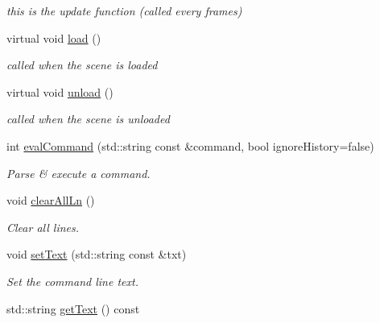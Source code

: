 \begin{DoxyCompactItemize}
\begin{DoxyCompactList}\small\item\em this is the update function (called every frames) \end{DoxyCompactList}\item 
\mbox{\label{class_scene_cheat_code_acbde1c4ec7592376b7a46cdbfdf98d4b}} 
virtual void \hyperlink{class_scene_cheat_code_acbde1c4ec7592376b7a46cdbfdf98d4b}{load} ()
\begin{DoxyCompactList}\small\item\em called when the scene is loaded \end{DoxyCompactList}\item 
\mbox{\label{class_scene_cheat_code_acb2e2c27b2cfb999815caebb65ab3231}} 
virtual void \hyperlink{class_scene_cheat_code_acb2e2c27b2cfb999815caebb65ab3231}{unload} ()
\begin{DoxyCompactList}\small\item\em called when the scene is unloaded \end{DoxyCompactList}\item 
int \hyperlink{class_scene_cheat_code_a8195fdcac7fa062e3c078e502edccddf}{eval\+Command} (std\+::string const \&command, bool ignore\+History=false)
\begin{DoxyCompactList}\small\item\em Parse \& execute a command. \end{DoxyCompactList}\item 
\mbox{\label{class_scene_cheat_code_a3a53c0bb0a52abad44966308a09aa48d}} 
void \hyperlink{class_scene_cheat_code_a3a53c0bb0a52abad44966308a09aa48d}{clear\+All\+Ln} ()
\begin{DoxyCompactList}\small\item\em Clear all lines. \end{DoxyCompactList}\item 
void \hyperlink{class_scene_cheat_code_a1b35f3a6cce3767aa22a4694e3271532}{set\+Text} (std\+::string const \&txt)
\begin{DoxyCompactList}\small\item\em Set the command line text. \end{DoxyCompactList}\item 
std\+::string \hyperlink{class_scene_cheat_code_a486c95c6866d50d337ac3f10a0acd631}{get\+Text} () const

\end{DoxyCompactItemize}
